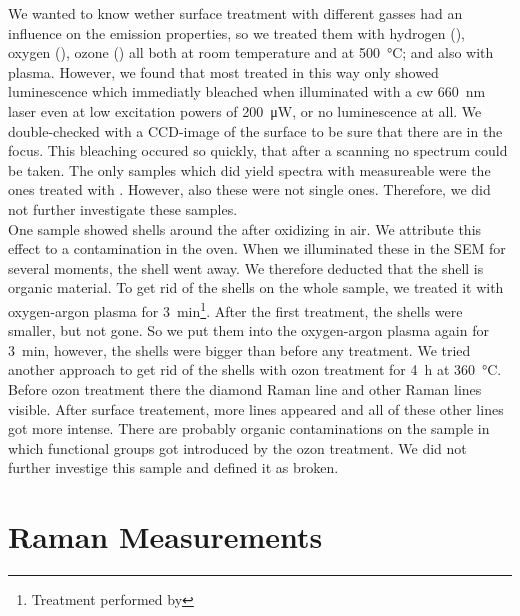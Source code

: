 		We wanted to know wether surface treatment with different gasses had an influence on the emission properties, so we treated them with hydrogen (), oxygen (), ozone () all both at room temperature and at \SI{500}{\celsius}; and also with  plasma.
		However, we found that most \nds treated in this way only showed luminescence which immediatly bleached when illuminated with a cw \SI{660}{nm} laser even at low excitation powers of \SI{200}{\micro\watt}, or no luminescence at all.
		We double-checked with a CCD-image of the surface to be sure that there are \nds in the focus.
		This bleaching occured so quickly, that after a scanning no spectrum could be taken.
		The only samples which did yield spectra with measureable \ZPLs were the ones treated with .
		However, also these \sivs were not single ones.
		Therefore, we did not further investigate these samples.
		\\
		One sample showed shells around the \nd after oxidizing in air.
		We attribute this effect to a contamination in the oven.
		When we illuminated these \nds in the SEM for several moments, the shell went away.
		We therefore deducted that the shell is organic material.
		To get rid of the shells on the whole sample, we treated it with oxygen-argon plasma for \SI{3}{min}\footnote{Treatment performed by \schmauch}.
		After the first treatment, the shells were smaller, but not gone.
		So we put them into the oxygen-argon plasma again for \SI{3}{min}, however, the shells were bigger than before any treatment.
		We tried another approach to get rid of the shells with ozon treatment for \SI{4}{\hour} at \SI{360}{\celsius}.
		Before ozon treatment there the diamond Raman line and other Raman lines visible.
		After surface treatement, more lines appeared and all of these other lines got more intense.
		There are probably organic contaminations on the sample in which functional groups got introduced by the ozon treatment.
		We did not further investige this sample and defined it as broken.



	\section{Raman Measurements} \label{sec::raman}


